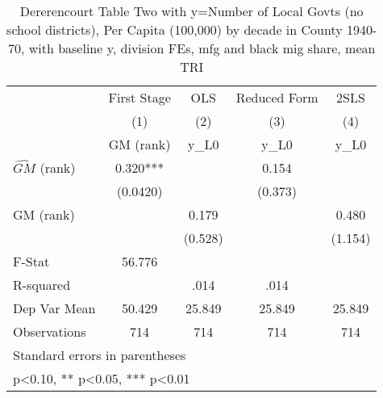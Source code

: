 \begin{table}[htbp]\centering
\def\sym#1{\ifmmode^{#1}\else\(^{#1}\)\fi}
\caption{Dererencourt Table Two with y=Number of Local Govts (no school districts), Per Capita (100,000) by decade in County 1940-70, with baseline y, division FEs, mfg and black mig share, mean TRI}
\begin{tabular}{l*{4}{c}}
\toprule
                    & First Stage   &         OLS   &Reduced Form   &        2SLS   \\
                    &\multicolumn{1}{c}{(1)}&\multicolumn{1}{c}{(2)}&\multicolumn{1}{c}{(3)}&\multicolumn{1}{c}{(4)}\\
                    &\multicolumn{1}{c}{GM  (rank)}&\multicolumn{1}{c}{y\_L0}&\multicolumn{1}{c}{y\_L0}&\multicolumn{1}{c}{y\_L0}\\
\midrule
$\hat{GM}$ (rank)   &       0.320***&               &       0.154   &               \\
                    &    (0.0420)   &               &     (0.373)   &               \\
\addlinespace
GM  (rank)          &               &       0.179   &               &       0.480   \\
                    &               &     (0.528)   &               &     (1.154)   \\
\midrule
F-Stat              &      56.776   &               &               &               \\
R-squared           &               &        .014   &        .014   &               \\
Dep Var Mean        &      50.429   &      25.849   &      25.849   &      25.849   \\
Observations        &         714   &         714   &         714   &         714   \\
\bottomrule
\multicolumn{5}{l}{\footnotesize Standard errors in parentheses}\\
\multicolumn{5}{l}{\footnotesize * p<0.10, ** p<0.05, *** p<0.01}\\
\end{tabular}
\end{table}

